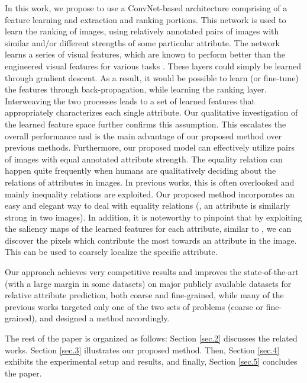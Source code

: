 In this work, we propose to use a ConvNet-based architecture comprising of a feature learning and extraction and ranking portions. This network is used to learn the ranking of images, using relatively annotated pairs of images with similar and/or different strengths of some particular attribute. The network learns a series of visual features, which are known %
 to perform better than the engineered visual features for various tasks \cite{offtheshelf}. These layers could simply be learned through gradient descent. As a result, it would be possible to learn (or fine-tune) the features through back-propagation, while learning the ranking layer.
Interweaving the two processes leads to a set of learned features that appropriately characterizes each single attribute. Our qualitative investigation of the learned feature space further confirms this assumption. This escalates the overall performance and is the main advantage of our proposed method over previous methods. 
Furthermore, our proposed model can effectively utilize pairs of images with equal annotated attribute strength. The equality relation can happen quite frequently when humans are qualitatively deciding about the relations of attributes in images. In previous works, this is often overlooked and mainly inequality relations are exploited. Our proposed method incorporates an easy and elegant way to deal with equality relations (\ie, an attribute is similarly strong in two images). 
In addition, it is noteworthy to pinpoint that by exploiting the saliency maps of the learned features for each attribute, similar to \cite{saliency}, we can discover the pixels which contribute the most towards an attribute in the image. This can be used to coarsely localize the specific attribute.

Our approach achieves very competitive results and improves the state-of-the-art (with a large margin in some datasets) on major publicly available datasets for relative attribute prediction, both coarse and fine-grained, while many of the previous works targeted only one of the two sets of problems (coarse or fine-grained), and designed a method accordingly.

The rest of the paper is organized as follows: Section \ref{sec.2} discusses the related works. Section \ref{sec.3} illustrates our proposed method. Then, Section \ref{sec.4} exhibits the experimental setup and results, and finally, Section \ref{sec.5} concludes the paper.
